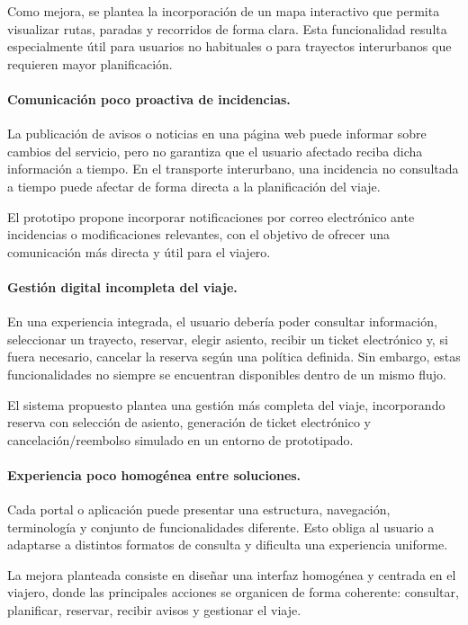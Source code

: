 Como mejora, se plantea la incorporación de un mapa interactivo que permita visualizar rutas, paradas y recorridos de forma clara. Esta funcionalidad resulta especialmente útil para usuarios no habituales o para trayectos interurbanos que requieren mayor planificación.

\paragraph{Comunicación poco proactiva de incidencias.}
La publicación de avisos o noticias en una página web puede informar sobre cambios del servicio, pero no garantiza que el usuario afectado reciba dicha información a tiempo. En el transporte interurbano, una incidencia no consultada a tiempo puede afectar de forma directa a la planificación del viaje.

El prototipo propone incorporar notificaciones por correo electrónico ante incidencias o modificaciones relevantes, con el objetivo de ofrecer una comunicación más directa y útil para el viajero.

\paragraph{Gestión digital incompleta del viaje.}
En una experiencia integrada, el usuario debería poder consultar información, seleccionar un trayecto, reservar, elegir asiento, recibir un ticket electrónico y, si fuera necesario, cancelar la reserva según una política definida. Sin embargo, estas funcionalidades no siempre se encuentran disponibles dentro de un mismo flujo.

El sistema propuesto plantea una gestión más completa del viaje, incorporando reserva con selección de asiento, generación de ticket electrónico y cancelación/reembolso simulado en un entorno de prototipado.

\paragraph{Experiencia poco homogénea entre soluciones.}
Cada portal o aplicación puede presentar una estructura, navegación, terminología y conjunto de funcionalidades diferente. Esto obliga al usuario a adaptarse a distintos formatos de consulta y dificulta una experiencia uniforme.

La mejora planteada consiste en diseñar una interfaz homogénea y centrada en el viajero, donde las principales acciones se organicen de forma coherente: consultar, planificar, reservar, recibir avisos y gestionar el viaje.

